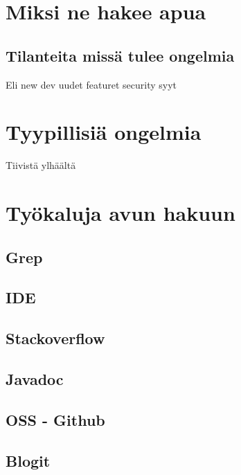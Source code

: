 \documentclass[finnish]{../tktltiki2}
\theoremstyle{definition}
\theoremstyle{remark}
\begin{document}
\section{Miksi ne hakee apua}
\subsection{Tilanteita missä tulee ongelmia}
Eli new dev
uudet featuret
security syyt
\section{Tyypillisiä ongelmia}
Tiivistä ylhäältä

\section{Työkaluja avun hakuun}
\subsection{Grep}
\subsection{IDE}

\subsection{Stackoverflow}
\subsection{Javadoc}
\subsection{OSS - Github}
\subsection{Blogit}




\end{document}
